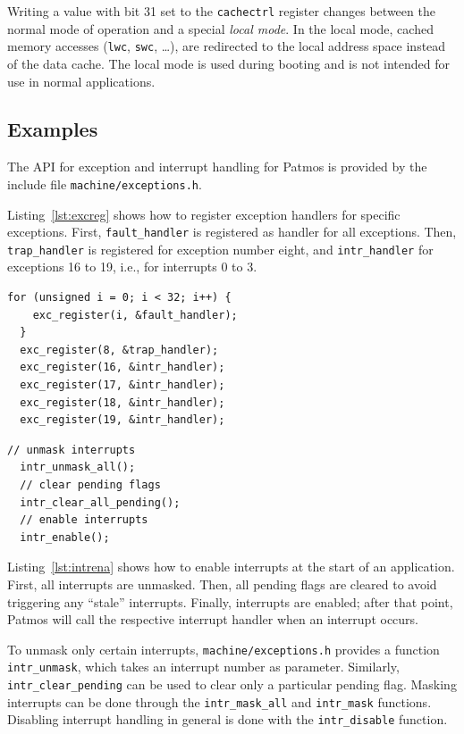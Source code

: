 \documentclass[a4paper,fontsize=10pt,twoside,DIV15,BCOR12mm,headinclude=true,footinclude=false,pagesize,bibtotoc]{scrbook}
\begin{document}
Writing a value with bit 31 set to the \texttt{cachectrl} register
changes between the normal mode of operation and a special \emph{local
  mode}. In the local mode, cached memory accesses (\texttt{lwc},
\texttt{swc}, \dots), are redirected to the local address space
instead of the data cache. The local mode is used during booting and
is not intended for use in normal applications.

\subsection{Examples}

The API for exception and interrupt handling for Patmos is provided by
the include file \texttt{machine/exceptions.h}.

Listing~\ref{lst:excreg} shows how to register exception handlers for
specific exceptions. First, \texttt{fault\_handler} is registered as
handler for all exceptions. Then, \texttt{trap\_handler} is registered
for exception number eight, and \texttt{intr\_handler} for exceptions
16 to 19, i.e., for interrupts 0 to 3.

\begin{lstlisting}[float, caption={Exception handler registration\label{lst:excreg}}]
  for (unsigned i = 0; i < 32; i++) {
	exc_register(i, &fault_handler);
  }
  exc_register(8, &trap_handler);
  exc_register(16, &intr_handler);
  exc_register(17, &intr_handler);
  exc_register(18, &intr_handler);
  exc_register(19, &intr_handler);
\end{lstlisting}

\begin{lstlisting}[float, caption={Interrupt enabling\label{lst:intrena}}]
  // unmask interrupts
  intr_unmask_all();
  // clear pending flags
  intr_clear_all_pending();
  // enable interrupts
  intr_enable();
\end{lstlisting}

Listing~\ref{lst:intrena} shows how to enable interrupts at the start
of an application. First, all interrupts are unmasked. Then, all
pending flags are cleared to avoid triggering any ``stale''
interrupts. Finally, interrupts are enabled; after that point, Patmos
will call the respective interrupt handler when an interrupt occurs.

To unmask only certain interrupts, \texttt{machine/exceptions.h}
provides a function \texttt{intr\_unmask}, which takes an interrupt
number as parameter. Similarly, \texttt{intr\_clear\_pending} can be
used to clear only a particular pending flag. Masking interrupts can
be done through the \texttt{intr\_mask\_all} and \texttt{intr\_mask}
functions. Disabling interrupt handling in general is done with the
\texttt{intr\_disable} function.
\end{document}
